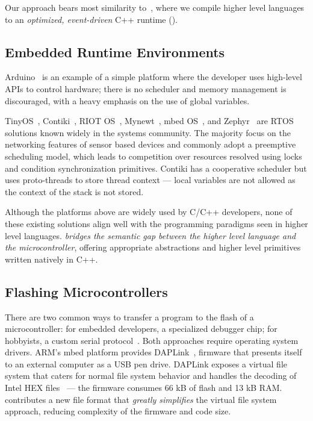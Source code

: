 Our approach bears most similarity to~\cite{varma2004java}, where we compile higher level languages to an \emph{optimized, event-driven} C++ runtime (\CON).

\subsection{Embedded Runtime Environments}


Arduino~\cite{buildingArduino2014} is an example of a simple platform where the developer uses high-level APIs to control hardware; there is no scheduler and memory management is discouraged, with a heavy emphasis on
the use of global variables.

TinyOS~\cite{levis2005tinyos}, Contiki~\cite{dunkels2012contiki}, RIOT OS~\cite{baccelli2013riot}, Mynewt~\cite{ApacheMy53:online}, mbed OS~\cite{ARMmbed}, and Zephyr~\cite{HomeZeph63:online} are RTOS solutions known widely in the systems community. The majority focus on the networking features of sensor based devices and commonly adopt a preemptive scheduling model, which leads to competition over resources resolved using locks and condition synchronization primitives. Contiki has a cooperative scheduler but uses proto-threads to store thread context --- local variables are not allowed as the context of the stack is not stored.

Although the platforms above are widely used by C/C++ developers, none of these existing solutions align well with the programming paradigms seen in higher level languages. \CO \emph{bridges the semantic gap between the higher level language and the microcontroller}, offering appropriate abstractions and higher level primitives written natively in C++.

\subsection{Flashing Microcontrollers}
There are two common ways to transfer a program to the flash of a microcontroller: for embedded developers, a specialized debugger chip; for hobbyists, a custom serial protocol~\cite{AVRDUDEA15:online}. Both approaches require operating system drivers. ARM's mbed platform provides DAPLink~\cite{GitHubAR5:online}, firmware that presents itself to an external computer as a USB pen drive. DAPLink exposes a virtual file system that caters for normal file system behavior and handles the decoding of Intel HEX files~\cite{IntelHEX} --- the firmware consumes 66 kB of flash and 13 kB RAM. \UF contributes a new file format that \emph{greatly simplifies} the virtual file system approach, reducing complexity of the firmware and code size.

